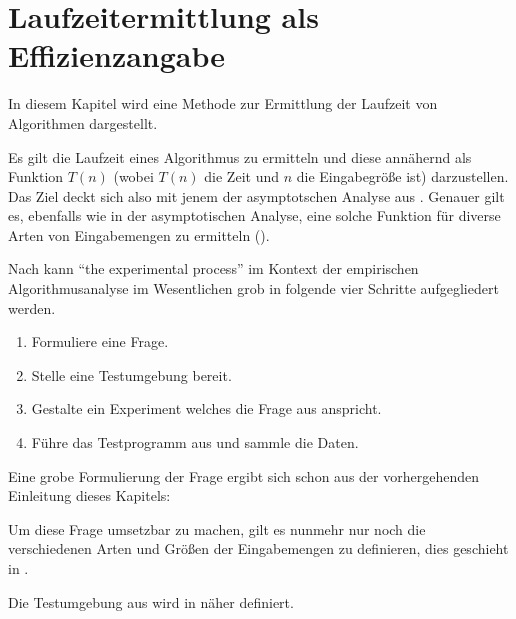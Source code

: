 \chapter{Laufzeitermittlung als Effizienzangabe}

In diesem Kapitel wird eine Methode zur Ermittlung der Laufzeit von Algorithmen dargestellt.

Es gilt die Laufzeit eines Algorithmus zu ermitteln und diese annähernd als Funktion $T(n)$ (wobei $T(n)$ die Zeit und $n$ die Eingabegröße ist) darzustellen. Das Ziel deckt sich also mit jenem der asymptotschen Analyse aus . Genauer gilt es, ebenfalls wie in der asymptotischen Analyse, eine solche Funktion für diverse Arten von Eingabemengen zu ermitteln (\cite[27]{mcg2012}).

Nach \cite[10]{mcg2012} kann \enquote{the experimental process} im Kontext der empirischen Algorithmusanalyse im Wesentlichen grob in folgende vier Schritte aufgegliedert werden.

\begin{enumerate}
    \item Formuliere eine Frage.\label{itm:experiment-formulate-question}
    \item Stelle eine Testumgebung bereit.\label{itm:experiment-environment}
    \item Gestalte ein Experiment welches die Frage aus  anspricht.
    \item Führe das Testprogramm aus und sammle die Daten.
\end{enumerate}

Eine grobe Formulierung der Frage ergibt sich schon aus der vorhergehenden Einleitung dieses Kapitels:


Um diese Frage umsetzbar zu machen, gilt es nunmehr nur noch die verschiedenen Arten und Größen der Eingabemengen zu definieren, dies geschieht in .

Die Testumgebung aus  wird in  näher definiert. 


